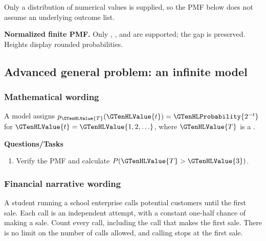 \noindent Only a distribution of numerical values is supplied, so the PMF below does not assume an underlying outcome list.\par\medskip
\Needspace{6.8cm}
\par\noindent \begin{minipage}[t]{.485\linewidth}
\centering
{}
\par\small \textbf{Normalized finite PMF.} Only , , and  are supported; the gap is preserved. Heights display rounded probabilities.
\end{minipage}\par\medskip

\subsection{Advanced general problem: an infinite model}
\label{subsec:t2-c1-advanced-general-problem-an-infinite-model}
\subsubsection*{Mathematical wording}
A model assigns $p_{\GTenHLValue{T}}(\GTenHLValue{t})=\GTenHLProbability{2^{-t}}$ for $\GTenHLValue{t}=\GTenHLValue{1,2,\ldots}$, where $\GTenHLValue{T}$ is a .

\textbf{Questions/Tasks}
\begin{enumerate}
\item Verify the PMF and calculate $P(\GTenHLValue{T}>\GTenHLValue{3})$.
\end{enumerate}
\subsubsection*{Financial narrative wording}
A student running a school enterprise calls potential customers until the first sale. Each call is an independent attempt, with a constant one-half chance of making a sale. Count every call, including the call that makes the first sale. There is no limit on the number of calls allowed, and calling stops at the first sale.

